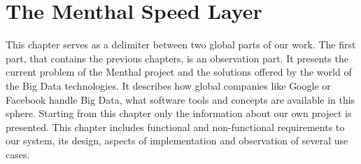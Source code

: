 \chapter{The Menthal Speed Layer}
\label{chap:menthal_backend_architecture}

This chapter serves as a delimiter between two global parts of our work.
The first part, that contains the previous chapters, is an observation part.
It presents the current problem of the Menthal project and the solutions offered by the world of the Big Data technologies.
It describes how global companies like Google or Facebook handle Big Data, what software tools and concepts are available in this sphere. 
Starting from this chapter only the information about our own project is presented.
This chapter includes functional and non-functional requirements to our system, its design, aspects of implementation and observation of several use cases.










